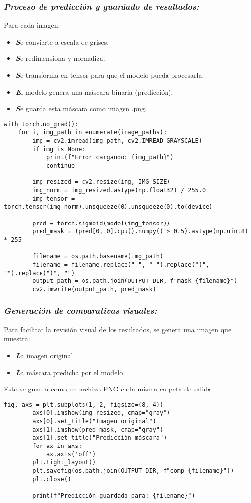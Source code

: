 \documentclass[12pt]{article}
\begin{document}
\subsubsection{\textit{Proceso de predicción y guardado de resultados:}}
Para cada imagen:
\begin{itemize}
    \item \textit\textbf Se convierte a escala de grises.
    \item \textit \textbf Se redimensiona y normaliza.
    \item \textit \textbf Se transforma en tensor para que el modelo pueda procesarla.
    \item \textit \textbf El modelo genera una máscara binaria (predicción).
    \item \textit \textbf Se guarda esta máscara como imagen .png.
\end{itemize}

\begin{lstlisting}[caption={Predicción y guardado de la máscara generada}, label=lst:predict_loop]
with torch.no_grad():
    for i, img_path in enumerate(image_paths):
        img = cv2.imread(img_path, cv2.IMREAD_GRAYSCALE)
        if img is None:
            print(f"Error cargando: {img_path}")
            continue

        img_resized = cv2.resize(img, IMG_SIZE)
        img_norm = img_resized.astype(np.float32) / 255.0
        img_tensor = torch.tensor(img_norm).unsqueeze(0).unsqueeze(0).to(device)

        pred = torch.sigmoid(model(img_tensor))
        pred_mask = (pred[0, 0].cpu().numpy() > 0.5).astype(np.uint8) * 255

        filename = os.path.basename(img_path)
        filename = filename.replace(" ", "_").replace("(", "").replace(")", "")
        output_path = os.path.join(OUTPUT_DIR, f"mask_{filename}")
        cv2.imwrite(output_path, pred_mask)
\end{lstlisting}
\subsubsection{\textit{Generación de comparativas visuales:}}
Para facilitar la revisión visual de los resultados, se genera una imagen que muestra:
\begin{itemize}
    \item \textit\textbf La imagen original.
    \item \textit \textbf La máscara predicha por el modelo.
\end{itemize}
Esto se guarda como un archivo PNG en la misma carpeta de salida.
\begin{lstlisting}[caption={Comparativa visual de la predicción}, label=lst:predict_comparison]
        fig, axs = plt.subplots(1, 2, figsize=(8, 4))
        axs[0].imshow(img_resized, cmap="gray")
        axs[0].set_title("Imagen original")
        axs[1].imshow(pred_mask, cmap="gray")
        axs[1].set_title("Predicción máscara")
        for ax in axs:
            ax.axis('off')
        plt.tight_layout()
        plt.savefig(os.path.join(OUTPUT_DIR, f"comp_{filename}"))
        plt.close()

        print(f"Predicción guardada para: {filename}")
\end{lstlisting}
\end{document}
